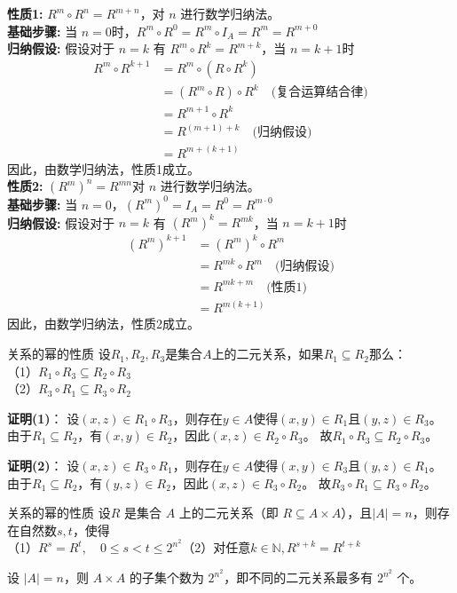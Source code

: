 \textbf{性质1:} \( R^m \circ R^n = R^{m+n} \)，对 \( n \) 进行数学归纳法。\\
\textbf{基础步骤:} 当 \( n = 0 \)时，$R^m \circ R^0 = R^m \circ I_A = R^m = R^{m+0}$\\
\textbf{归纳假设:} 假设对于 \( n = k \) 有 \( R^m \circ R^k = R^{m+k} \)，当 \( n = k+1 \)时
\begin{align*}
R^m \circ R^{k+1} &= R^m \circ (R \circ R^k) \\
&= (R^m \circ R) \circ R^k \quad \text{(复合运算结合律)} \\
&= R^{m+1} \circ R^k \\
&= R^{(m+1)+k} \quad \text{(归纳假设)} \\
&= R^{m+(k+1)}
\end{align*}
因此，由数学归纳法，性质1成立。\\
\textbf{性质2:} \( (R^m)^n = R^{mn} \)对 \( n \) 进行数学归纳法。\\
\textbf{基础步骤:} 当 \( n = 0 \)，$(R^m)^0 = I_A = R^0 = R^{m \cdot 0}$\\
\textbf{归纳假设:} 假设对于 \( n = k \) 有 \( (R^m)^k = R^{mk} \)，当 \( n = k+1 \)时
\begin{align*}
(R^m)^{k+1} &= (R^m)^k \circ R^m \\
&= R^{mk} \circ R^m \quad \text{(归纳假设)} \\
&= R^{mk + m} \quad \text{(性质1)} \\
&= R^{m(k+1)}
\end{align*}
因此，由数学归纳法，性质2成立。
\begin{theorem}{关系的幂的性质}{}
设$R_1,R_2,R_3$是集合$A$上的二元关系，如果$R_1\subseteq R_2$那么：\\
（1）$R_1\circ R_3\subseteq R_2\circ R_3$\\
（2）$R_3\circ R_1\subseteq R_3\circ R_2$
\end{theorem}
\textbf{证明(1)}：
设$(x,z)\in R_1\circ R_3$，则存在$y\in A$使得$(x,y)\in R_1$且$(y,z)\in R_3$。
由于$R_1\subseteq R_2$，有$(x,y)\in R_2$，因此$(x,z)\in R_2\circ R_3$。
故$R_1\circ R_3\subseteq R_2\circ R_3$。

\textbf{证明(2)}：
设$(x,z)\in R_3\circ R_1$，则存在$y\in A$使得$(x,y)\in R_3$且$(y,z)\in R_1$。
由于$R_1\subseteq R_2$，有$(y,z)\in R_2$，因此$(x,z)\in R_3\circ R_2$。
故$R_3\circ R_1\subseteq R_3\circ R_2$。
\begin{theorem}{关系的幂的性质}{}
    设\( R \) 是集合 \( A \) 上的二元关系（即 \( R \subseteq A \times A \)），且$|A|=n$，则存在自然数$s,t$，使得\\
    （1）$R^s=R^t,\quad 0\leq s<t\leq 2^{n^2}$\quad（2）对任意$k\in\mathbb{N},R^{s+k}=R^{t+k}$
\end{theorem}
设 $|A| = n$，则 $A \times A$ 的子集个数为 $2^{n^2}$，即不同的二元关系最多有 $2^{n^2}$ 个。

